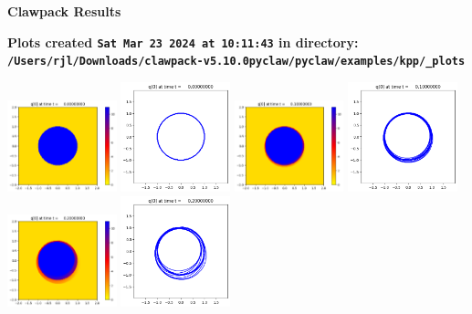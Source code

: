 \documentclass[11pt]{article}
\begin{document}
        \begin{center}{\Large\bf Clawpack Results}\vskip 5pt
        
        \bf Plots created {\tt Sat Mar 23 2024 at 10:11:43} in directory: \vskip 5pt
        \verb+/Users/rjl/Downloads/clawpack-v5.10.0pyclaw/pyclaw/examples/kpp/_plots+
        \end{center}
        \vskip 5pt
        \includegraphics[width=0.2375\textwidth]{frame0000fig0.png}
\includegraphics[width=0.2375\textwidth]{frame0000fig1.png}
\includegraphics[width=0.2375\textwidth]{frame0001fig0.png}
\includegraphics[width=0.2375\textwidth]{frame0001fig1.png}
\vskip 10pt 
\includegraphics[width=0.2375\textwidth]{frame0002fig0.png}
\includegraphics[width=0.2375\textwidth]{frame0002fig1.png}
\end{document}
